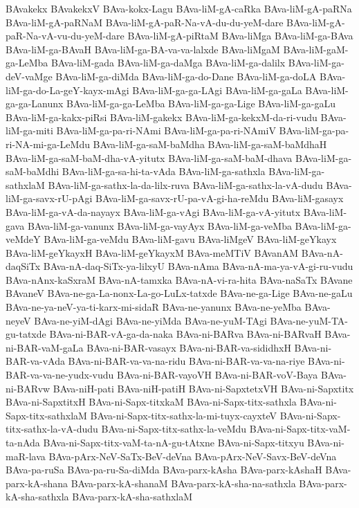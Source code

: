 {BAvakekx
BAvakekxV
BAva-kokx-Lagu
BAva-liM-gA-caRka
BAva-liM-gA-paRNa
BAva-liM-gA-paRNaM
BAva-liM-gA-paR-Na-vA-du-du-yeM-dare
BAva-liM-gA-paR-Na-vA-vu-du-yeM-dare
BAva-liM-gA-piRtaM
BAva-liMga
BAva-liM-ga-BAva
BAva-liM-ga-BAvaH
BAva-liM-ga-BA-va-va-lalxde
BAva-liMgaM
BAva-liM-gaM-ga-LeMba
BAva-liM-gada
BAva-liM-ga-daMga
BAva-liM-ga-dalilx
BAva-liM-ga-deV-vaMge
BAva-liM-ga-diMda
BAva-liM-ga-do-Dane
BAva-liM-ga-doLA
BAva-liM-ga-do-La-geY-kayx-mAgi
BAva-liM-ga-ga-LAgi
BAva-liM-ga-gaLa
BAva-liM-ga-ga-Lanunx
BAva-liM-ga-ga-LeMba
BAva-liM-ga-ga-Lige
BAva-liM-ga-gaLu
BAva-liM-ga-kakx-piRsi
BAva-liM-gakekx
BAva-liM-ga-kekxM-da-ri-vudu
BAva-liM-ga-miti
BAva-liM-ga-pa-ri-NAmi
BAva-liM-ga-pa-ri-NAmiV
BAva-liM-ga-pa-ri-NA-mi-ga-LeMdu
BAva-liM-ga-saM-baMdha
BAva-liM-ga-saM-baMdhaH
BAva-liM-ga-saM-baM-dha-vA-yitutx
BAva-liM-ga-saM-baM-dhava
BAva-liM-ga-saM-baMdhi
BAva-liM-ga-sa-hi-ta-vAda
BAva-liM-ga-sathxla
BAva-liM-ga-sathxlaM
BAva-liM-ga-sathx-la-da-lilx-ruva
BAva-liM-ga-sathx-la-vA-dudu
BAva-liM-ga-savx-rU-pAgi
BAva-liM-ga-savx-rU-pa-vA-gi-ha-reMdu
BAva-liM-gasayx
BAva-liM-ga-vA-da-nayayx
BAva-liM-ga-vAgi
BAva-liM-ga-vA-yitutx
BAva-liM-gava
BAva-liM-ga-vanunx
BAva-liM-ga-vayAyx
BAva-liM-ga-veMba
BAva-liM-ga-veMdeY
BAva-liM-ga-veMdu
BAva-liM-gavu
BAva-liMgeV
BAva-liM-geYkayx
BAva-liM-geYkayxH
BAva-liM-geYkayxM
BAva-meMTiV
BAvanAM
BAva-nA-daqSiTx
BAva-nA-daq-SiTx-ya-lilxyU
BAva-nAma
BAva-nA-ma-ya-vA-gi-ru-vudu
BAva-nAnx-kaSxraM
BAva-nA-tamxka
BAva-nA-vi-ra-hita
BAva-naSaTx
BAvane
BAvaneV
BAva-ne-ga-La-nonx-La-go-LuLx-tatxde
BAva-ne-ga-Lige
BAva-ne-gaLu
BAva-ne-ya-neV-ya-ti-karx-mi-sidaR
BAva-ne-yanunx
BAva-ne-yeMba
BAva-neyeV
BAva-ne-yiM-dAgi
BAva-ne-yiMda
BAva-ne-yuM-TAgi
BAva-ne-yuM-TA-gu-tatxde
BAva-ni-BAR-vA-ga-da-naka
BAva-ni-BARva
BAva-ni-BARvaH
BAva-ni-BAR-vaM-gaLa
BAva-ni-BAR-vasayx
BAva-ni-BAR-va-sididhxH
BAva-ni-BAR-va-vAda
BAva-ni-BAR-va-va-na-ridu
BAva-ni-BAR-va-va-na-riye
BAva-ni-BAR-va-va-ne-yudx-vudu
BAva-ni-BAR-vayoVH
BAva-ni-BAR-voV-Baya
BAva-ni-BARvw
BAva-niH-pati
BAva-niH-patiH
BAva-ni-SapxtetxVH
BAva-ni-Sapxtitx
BAva-ni-SapxtitxH
BAva-ni-Sapx-titxkaM
BAva-ni-Sapx-titx-sathxla
BAva-ni-Sapx-titx-sathxlaM
BAva-ni-Sapx-titx-sathx-la-mi-tuyx-cayxteV
BAva-ni-Sapx-titx-sathx-la-vA-dudu
BAva-ni-Sapx-titx-sathx-la-veMdu
BAva-ni-Sapx-titx-vaM-ta-nAda
BAva-ni-Sapx-titx-vaM-ta-nA-gu-tAtxne
BAva-ni-Sapx-titxyu
BAva-ni-maR-lava
BAva-pArx-NeV-SaTx-BeV-deVna
BAva-pArx-NeV-Savx-BeV-deVna
BAva-pa-ruSa
BAva-pa-ru-Sa-diMda
BAva-parx-kAsha
BAva-parx-kAshaH
BAva-parx-kA-shana
BAva-parx-kA-shanaM
BAva-parx-kA-sha-na-sathxla
BAva-parx-kA-sha-sathxla
BAva-parx-kA-sha-sathxlaM
}
